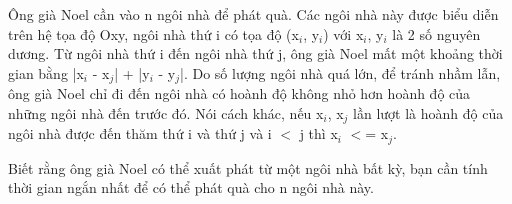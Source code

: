 Ông già Noel cần vào n ngôi nhà để phát quà. Các ngôi nhà này được biểu diễn trên hệ tọa độ Oxy, ngôi nhà thứ i có tọa độ (x$_i$, y$_i$) với x$_i$, y$_i$ là 2 số nguyên dương. Từ ngôi nhà thứ i đến ngôi nhà thứ j, ông già Noel mất một khoảng thời gian bằng |x$_i$ - x$_j$| + |y$_i$ - y$_j$|. Do số lượng ngôi nhà quá lớn, để tránh nhầm lẫn, ông già Noel chỉ đi đến ngôi nhà có hoành độ không nhỏ hơn hoành độ của những ngôi nhà đến trước đó. Nói cách khác, nếu x$_i$, x$_j$ lần lượt là hoành độ của ngôi nhà được đến thăm thứ i và thứ j và i $<$ j thì x$_i$ $<$= x$_j$.

Biết rằng ông già Noel có thể xuất phát từ một ngôi nhà bất kỳ, bạn cần tính thời gian ngắn nhất để có thể phát quà cho n ngôi nhà này.